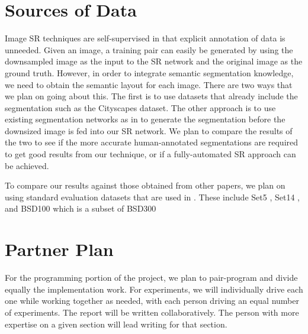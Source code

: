 \documentclass[10pt,twocolumn,letterpaper]{article}
\begin{document}
\section{Sources of Data}
Image SR techniques are self-supervised in that explicit annotation of data is
unneeded. Given an image, a training pair can easily be generated by using the
downsampled image as the input to the SR network and the original image as the
ground truth. However, in order to integrate semantic segmentation knowledge,
we need to obtain the semantic layout for each image. There are two ways that we
plan on going about this. The first is to use datasets that already include
the segmentation such as the Cityscapes \cite{Cityscapes} dataset. The other
approach is to use existing segmentation networks as in
\cite{FullyConvolutionalSS} to generate the segmentation before the downsized
image is fed into our SR network. We plan to compare the results of the two to
see if the more accurate human-annotated segmentations are required to get good
results from our technique, or if a fully-automated SR approach can be achieved.

To compare our results against those obtained from other papers, we plan on
using standard evaluation datasets that are used in \cite{SRGAN}. These include
Set5 \cite{Set5}, Set14 \cite{Set14}, and BSD100 which is a subset of
BSD300 \cite{BSD300}


\section{Partner Plan}
For the programming portion of the project, we plan to pair-program and
divide equally the implementation work. For experiments, we will individually
drive each one while working together as needed, with each person driving an
equal number of experiments. The report will be written collaboratively. The
person with more expertise on a given section will lead writing for that
section.

\end{document}
